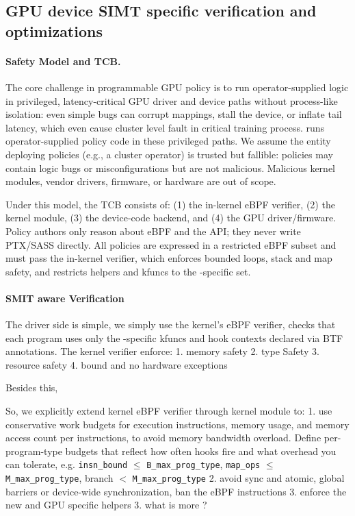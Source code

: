\subsection{\sys GPU device SIMT specific verification and optimizations}
\label{sec:safety-model}

\paragraph{Safety Model and TCB.}
The core challenge in programmable GPU policy is to run operator-supplied logic in privileged, latency-critical GPU driver and device paths without process-like isolation: even simple bugs can corrupt mappings, stall the device, or inflate tail latency, which even cause cluster level fault in critical training process. \sys runs operator-supplied policy code in these privileged paths. We assume the entity deploying \sys policies (e.g., a cluster operator) is trusted but fallible: policies may contain logic bugs or misconfigurations but are not malicious. Malicious kernel modules, vendor drivers, firmware, or hardware are out of scope.

Under this model, the \sys TCB consists of: (1) the in-kernel eBPF verifier, (2) the \sys kernel module, (3) the device-code backend, and (4) the GPU driver/firmware. Policy authors only reason about eBPF and the \sys API; they never write PTX/SASS directly. All policies are expressed in a restricted eBPF subset and must pass the in-kernel verifier, which enforces bounded loops, stack and map safety, and restricts helpers and kfuncs to the \sys-specific set.

\paragraph{SMIT aware Verification}

The driver side is simple, we simply use the kernel's eBPF verifier, checks that each program uses only the \sys-specific kfuncs and hook contexts declared via BTF annotations. The kernel verifier enforce:
1. memory safety
2. type Safety
3. resource safety
4. bound and no hardware exceptions

Besides this,

So, we explicitly extend kernel eBPF verifier through kernel module to:
1. use conservative work budgets for execution instructions, memory usage, and memory access count per instructions, to avoid memory bandwidth overload. Define per-program-type budgets that reflect how often hooks fire and what overhead you can tolerate, e.g. \texttt{insn\_bound} $\le$ \texttt{B\_max\_prog\_type}, \texttt{map\_ops} $\le$ \texttt{M\_max\_prog\_type}, branch $<$ \texttt{M\_max\_prog\_type}
2. avoid sync and atomic, global barriers or device-wide synchronization, ban the eBPF instructions
3. enforce the new and GPU specific helpers
3. what is more ?


